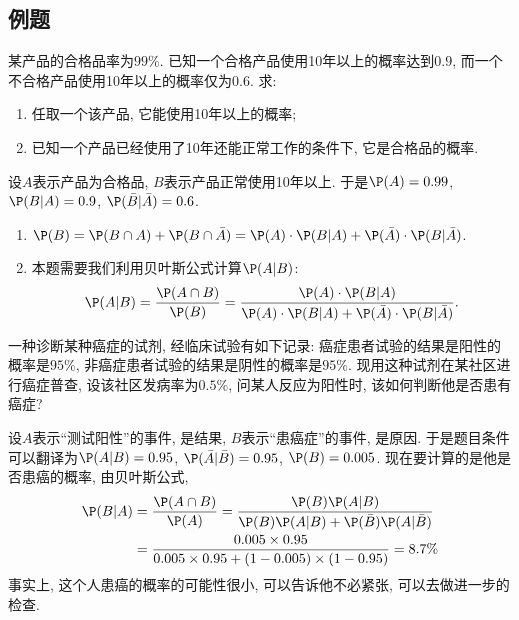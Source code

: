 \documentclass[11pt]{ctexart}
\begin{document}
\subsection{例题}

\begin{example}
某产品的合格品率为$99\%$. 
已知一个合格产品使用10年以上的概率达到$0.9$, 而一个不合格产品使用10年以上的概率仅为$0.6$.
求: 
\begin{enumerate}
	\item 任取一个该产品, 它能使用10年以上的概率;
	\item 已知一个产品已经使用了10年还能正常工作的条件下, 它是合格品的概率. 
\end{enumerate}
\end{example}
\begin{solution}
	设$A$表示产品为合格品, $B$表示产品正常使用10年以上. 
	于是$\P(A) = 0.99$, $\P(B | A) = 0.9$, $\P(\bar B | \bar A) = 0.6$. 
	\begin{enumerate}
		\item $\P(B) = \P(B \cap A) + \P(B \cap \bar A) = \P(A) \cdot \P(B | A) + \P(\bar A) \cdot \P(B | \bar A)$. 
		\item 本题需要我们利用贝叶斯公式计算$\P(A|B)$: 
			\begin{equation*}
				\P(A|B)
				= \frac{\P(A \cap B)}{\P(B)}
				= \frac{ \P(A) \cdot \P(B | A)}{\P(A) \cdot \P(B | A) + \P(\bar A) \cdot \P(B | \bar A)}. 
			\end{equation*}
	\end{enumerate}
\end{solution}

\begin{example}[贝叶斯公式的应用]\label{ex:Bayes-CancerTest}
	一种诊断某种癌症的试剂, 经临床试验有如下记录: 癌症患者试验的结果是阳性的概率是$95 \%$, 非癌症患者试验的结果是阴性的概率是$95 \%$. 
	现用这种试剂在某社区进行癌症普查, 设该社区发病率为$0.5 \%$, 问某人反应为阳性时, 该如何判断他是否患有癌症?\cite{weilaisheng:2024a} 
\end{example}
\begin{solution}
	设$A$表示“测试阳性”的事件, 是结果, $B$表示“患癌症”的事件, 是原因. 
	于是题目条件可以翻译为$\P(A | B) = 0.95$, $\P(\bar A | \bar B) = 0.95$, $\P(B) = 0.005$.
	现在要计算的是他是否患癌的概率, 由贝叶斯公式, 
	\begin{align*}
		\P(B | A)
		&= \frac{\P(A \cap B)}{\P(A)}
		= \frac{\P(B) \P(A | B)}{\P(B) \P(A | B) + \P(\bar B) \P(A | \bar B)} \\
		&= \frac{0.005 \times 0.95}{0.005 \times 0.95 + (1-0.005) \times (1-0.95)}
		= 8.7 \%
	\end{align*}
	事实上, 这个人患癌的概率的可能性很小, 可以告诉他不必紧张, 可以去做进一步的检查. 	
\end{solution}
\end{document}

